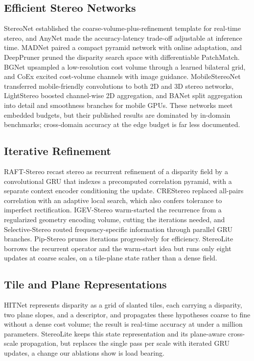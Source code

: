 \documentclass[conference]{IEEEtran}
\begin{document}
\subsection{Efficient Stereo Networks}
StereoNet \cite{khamis2018stereonet} established the coarse-volume-plus-refinement template for real-time stereo, and AnyNet \cite{wang2019anynet} made the accuracy-latency trade-off adjustable at inference time. MADNet \cite{tonioni2019madnet} paired a compact pyramid network with online adaptation, and DeepPruner \cite{duggal2019deeppruner} pruned the disparity search space with differentiable PatchMatch. BGNet \cite{xu2021bgnet} upsampled a low-resolution cost volume through a learned bilateral grid, and CoEx \cite{bangunharcana2021coex} excited cost-volume channels with image guidance. MobileStereoNet \cite{shamsafar2022mobilestereonet} transferred mobile-friendly convolutions to both 2D and 3D stereo networks, LightStereo \cite{guo2025lightstereo} boosted channel-wise 2D aggregation, and BANet \cite{xu2025banet} split aggregation into detail and smoothness branches for mobile GPUs. These networks meet embedded budgets, but their published results are dominated by in-domain benchmarks; cross-domain accuracy at the edge budget is far less documented.

\subsection{Iterative Refinement}
RAFT-Stereo \cite{lipson2021raftstereo} recast stereo as recurrent refinement of a disparity field by a convolutional GRU that indexes a precomputed correlation pyramid, with a separate context encoder conditioning the update. CREStereo \cite{li2022crestereo} replaced all-pairs correlation with an adaptive local search, which also confers tolerance to imperfect rectification. IGEV-Stereo \cite{xu2023igev} warm-started the recurrence from a regularized geometry encoding volume, cutting the iterations needed, and Selective-Stereo \cite{wang2024selective} routed frequency-specific information through parallel GRU branches. Pip-Stereo \cite{zheng2026pipstereo} prunes iterations progressively for efficiency. StereoLite borrows the recurrent operator and the warm-start idea but runs only eight updates at coarse scales, on a tile-plane state rather than a dense field.

\subsection{Tile and Plane Representations}
HITNet \cite{tankovich2021hitnet} represents disparity as a grid of slanted tiles, each carrying a disparity, two plane slopes, and a descriptor, and propagates these hypotheses coarse to fine without a dense cost volume; the result is real-time accuracy at under a million parameters. StereoLite keeps this state representation and its plane-aware cross-scale propagation, but replaces the single pass per scale with iterated GRU updates, a change our ablations show is load bearing.
\end{document}
